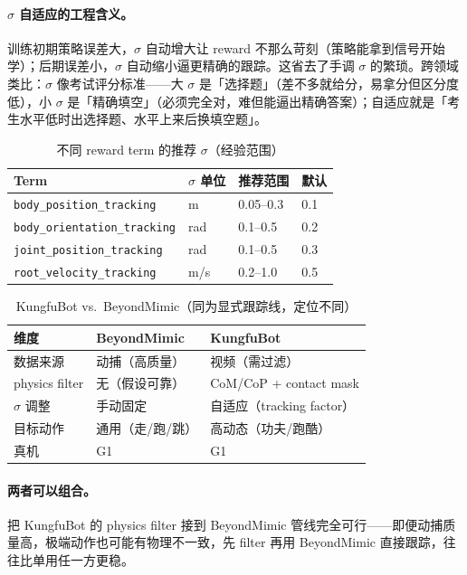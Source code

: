 \paragraph{$\sigma$ 自适应的工程含义。}训练初期策略误差大，$\sigma$ 自动增大让 reward 不那么苛刻（策略能拿到信号开始学）；后期误差小，$\sigma$ 自动缩小逼更精确的跟踪。这省去了手调 $\sigma$ 的繁琐。跨领域类比：$\sigma$ 像考试评分标准——大 $\sigma$ 是「选择题」（差不多就给分，易拿分但区分度低），小 $\sigma$ 是「精确填空」（必须完全对，难但能逼出精确答案）；自适应就是「考生水平低时出选择题、水平上来后换填空题」。

\begin{table}[ht]
\centering
\small
\caption{不同 reward term 的推荐 $\sigma$（经验范围）}
\label{tab:rlmc-mi-sigma}
\begin{tabular}{@{}llll@{}}
\toprule
Term & $\sigma$ 单位 & 推荐范围 & 默认 \\
\midrule
\verb|body_position_tracking| & m & 0.05--0.3 & 0.1 \\
\verb|body_orientation_tracking| & rad & 0.1--0.5 & 0.2 \\
\verb|joint_position_tracking| & rad & 0.1--0.5 & 0.3 \\
\verb|root_velocity_tracking| & m/s & 0.2--1.0 & 0.5 \\
\bottomrule
\end{tabular}
\end{table}

\begin{table}[ht]
\centering
\small
\caption{KungfuBot vs.\ BeyondMimic（同为显式跟踪线，定位不同）}
\label{tab:rlmc-mi-kvb}
\begin{tabular}{@{}lll@{}}
\toprule
维度 & BeyondMimic & KungfuBot \\
\midrule
数据来源 & 动捕（高质量） & 视频（需过滤） \\
physics filter & 无（假设可靠） & CoM/CoP + contact mask \\
$\sigma$ 调整 & 手动固定 & 自适应（tracking factor） \\
目标动作 & 通用（走/跑/跳） & 高动态（功夫/跑酷） \\
真机 & G1 & G1 \\
\bottomrule
\end{tabular}
\end{table}

\paragraph{两者可以组合。}把 KungfuBot 的 physics filter 接到 BeyondMimic 管线完全可行——即便动捕质量高，极端动作也可能有物理不一致，先 filter 再用 BeyondMimic 直接跟踪，往往比单用任一方更稳。


